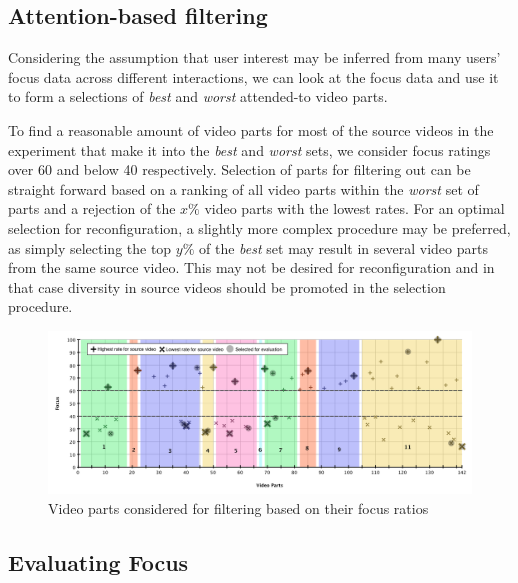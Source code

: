 
\subsection{Attention-based filtering} %
\label{sub:attention_based_filtering}

Considering the assumption that user interest may be inferred from many users' focus data across different interactions, we can look at the focus data and use it to form a selections of \emph{best} and \emph{worst} attended-to video parts.

To find a reasonable amount of video parts for most of the source videos in the experiment that make it into the \emph{best} and \emph{worst} sets, we consider focus ratings over 60 and below 40 respectively. Selection of parts for filtering out can be straight forward based on a ranking of all video parts within the \emph{worst} set of parts and a rejection of the $x\%$ video parts with the lowest rates. For an optimal selection for reconfiguration, a slightly more complex procedure may be preferred, as simply selecting the top $y\%$ of the \emph{best} set may result in several video parts from the same source video. This may not be desired for reconfiguration and in that case diversity in source videos should be promoted in the selection procedure.

\begin{figure}[htbp]
  \centering
    \includegraphics[width=1\textwidth]{img/focus_selection}
  \caption{Video parts considered for filtering based on their focus ratios}
  \label{fig:focus_selection}
\end{figure}



\subsection{Evaluating Focus} %
\label{sub:evaluating_focus}

